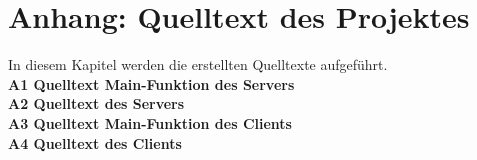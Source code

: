 \appendix

\chapter{Anhang: Quelltext des Projektes}
In diesem Kapitel werden die erstellten Quelltexte aufgeführt.\\[0.5cm]
\textbf{A1	Quelltext Main-Funktion des Servers}\\[0.5cm]
\textbf{A2	Quelltext des Servers}\\[0.5cm]
\textbf{A3	Quelltext Main-Funktion des Clients}\\[0.5cm]
\textbf{A4	Quelltext  des Clients}\\[0.5cm]











